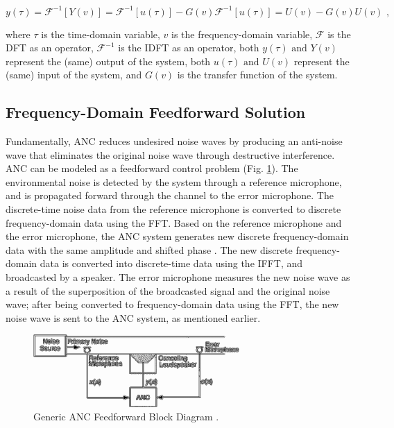 \documentclass[11pt, letterpaper]{article}
\numberwithin{equation}{section}
\begin{document}
\begin{equation}
    y(\tau) = \mathcal{F}^{-1}[Y(v)] = \mathcal{F}^{-1}[u(\tau)] - G(v) \mathcal{F}^{-1}[u(\tau)] = U(v) - G(v) U(v) \text{ ,}
\end{equation}

where $\tau$ is the time-domain variable, $v$ is the frequency-domain variable, $\mathcal{F}$ is the DFT as an operator, $\mathcal{F}^{-1}$ is the IDFT as an operator, both $y(\tau) \text{ and } Y(v)$ represent the (same) output of the system, both $u(\tau) \text{ and } U(v)$ represent the (same) input of the system, and $G(v)$ is the transfer function of the system.

\subsection{Frequency-Domain Feedforward Solution}

Fundamentally, ANC reduces undesired noise waves by producing an anti-noise wave that eliminates the original noise wave through destructive interference. ANC can be modeled as a feedforward control problem (Fig. \ref{fig:ANC_gen}). The environmental noise is detected by the system through a reference microphone, and is propagated forward through the channel to the error microphone. The discrete-time noise data from the reference microphone is converted to discrete frequency-domain data using the FFT. Based on the reference microphone and the error microphone, the ANC system generates new discrete frequency-domain data with the same amplitude and shifted phase \cite{kajikawa}. The new discrete frequency-domain data is converted into discrete-time data using the IFFT, and broadcasted by a speaker. The error microphone measures the new noise wave as a result of the superposition of the broadcasted signal and the original noise wave; after being converted to frequency-domain data using the FFT, the new noise wave is sent to the ANC system, as mentioned earlier.

\begin{figure}[H]
	\begin{center}
		\includegraphics[height=0.2\textheight, width=0.7\textwidth]{images/kuo_ANC_gen_fdfw.png}
		\caption{Generic ANC Feedforward Block Diagram \cite{kuo}.}
		\label{fig:ANC_gen}
	\end{center}
\end{figure}
\end{document}
